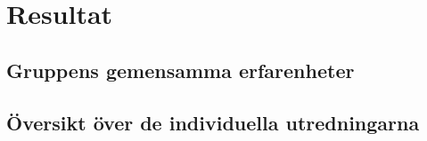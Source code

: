 \section{Resultat}

\subsection{Gruppens gemensamma erfarenheter}

\subsection{Översikt över de individuella utredningarna}